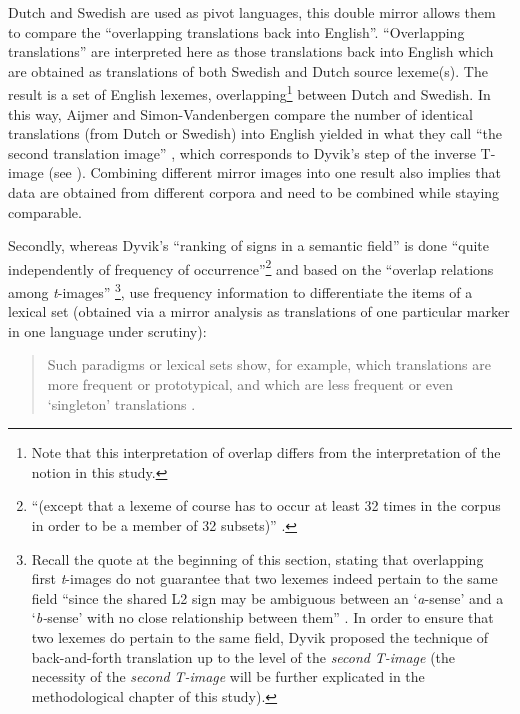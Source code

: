 Dutch and Swedish are used as pivot languages, this double mirror allows them to compare the “overlapping translations back into English”. “Overlapping translations” are interpreted here as those translations back into English which are obtained as translations of both Swedish and Dutch source lexeme(s). The result is a set of English lexemes, overlapping\footnote{Note that this interpretation of overlap differs from the interpretation of the notion in this study.} between Dutch and Swedish. In this way, Aijmer and Simon-Vandenbergen compare  the number of identical translations (from Dutch or Swedish) into English yielded in what they call “the second translation image” \citep[1796]{aijmer_model_2004}, which corresponds to Dyvik’s step of the inverse T-image (see ). Combining different mirror images into one result also implies that data are obtained from different corpora and need to be combined while staying comparable.

Secondly, whereas Dyvik’s “ranking of signs in a semantic field” is done “quite independently of frequency of occurrence”\footnote{“(except that a lexeme of course has to occur at least 32 times in the corpus in order to be a member of 32 subsets)” \citep[73]{johansson_translational_1998}.} and based on the “overlap relations among \textit{t}{}-images” \citep[73]{johansson_translational_1998}\footnote{Recall the quote at the beginning of this section, stating that overlapping first \textit{t}{}-images do not guarantee that two lexemes indeed pertain to the same field “since the shared L2 sign may be ambiguous between an ‘\textit{a}{}-sense’ and a ‘\textit{b-}sense’ with no close relationship between them” \citep[72]{johansson_translational_1998}. In order to ensure that two lexemes do pertain to the same field, Dyvik proposed the technique of back-and-forth translation up to the level of the \textit{second} \textit{T-image} (the necessity of the \textit{second} \textit{T-image} will be further explicated in the methodological chapter of this study).}, \citet{aijmer_model_2004} use frequency information to differentiate the items of a lexical set (obtained via a mirror analysis as translations of one particular marker in one language under scrutiny): 

\begin{quote}
Such paradigms or lexical sets show, for example, which translations are more frequent or prototypical, and which are less frequent or even ‘singleton’ translations \citep[1785--1786]{aijmer_model_2004}.
\end{quote}

